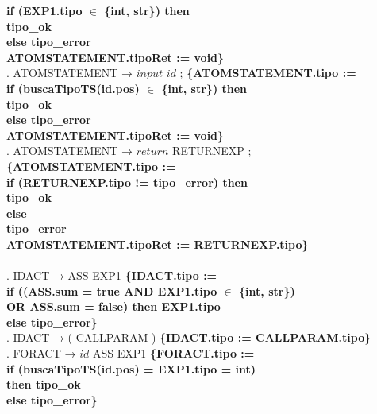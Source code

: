 \begin{tabbing}
    \>                    \> \textbf{if (EXP1.tipo $\in$ \{int, str\}) then}\\
    \>                    \> \> \textbf{tipo\_ok}\\
    \>                    \> \textbf{else tipo\_error}\\
    \>                    \> \textbf{ATOMSTATEMENT.tipoRet := void\}}\\
    . ATOMSTATEMENT → $input$ $id$ ; \textbf{\{ATOMSTATEMENT.tipo := }\\
    \>                    \> \textbf{if (buscaTipoTS(id.pos) $\in$ \{int, str\}) then}\\
    \>                    \> \> \textbf{tipo\_ok}\\
    \>                    \> \textbf{else tipo\_error}\\
    \>                    \> \textbf{ATOMSTATEMENT.tipoRet := void\}}\\
    . ATOMSTATEMENT → $return$ RETURNEXP ; \textbf{\{ATOMSTATEMENT.tipo :=}\\
    \>                    \> \textbf{if (RETURNEXP.tipo != tipo\_error) then}\\
    \>                    \> \> \textbf{tipo\_ok}\\
    \>                    \> \textbf{else}\\
    \>                    \> \> \textbf{tipo\_error}\\
    \>                    \> \textbf{ATOMSTATEMENT.tipoRet := RETURNEXP.tipo\}}\\
    \\
    . IDACT → ASS EXP1 \textbf{\{IDACT.tipo :=}\\
    \>                    \> \textbf{if ((ASS.sum = true AND EXP1.tipo $\in$ \{int, str\})}\\
    \>                    \> \>\textbf{OR ASS.sum = false) then EXP1.tipo}\\
    \>                    \> \textbf{else tipo\_error\}}\\
    . IDACT → ( CALLPARAM ) \textbf{\{IDACT.tipo := CALLPARAM.tipo\}}\\
    . FORACT → $id$ ASS EXP1 \textbf{\{FORACT.tipo :=}\\
    \>                    \> \textbf{if (buscaTipoTS(id.pos) = EXP1.tipo = int)}\\
    \>                    \> \> \textbf{then tipo\_ok}\\
    \>                    \> \textbf{else tipo\_error\}}\\

\end{tabbing}
